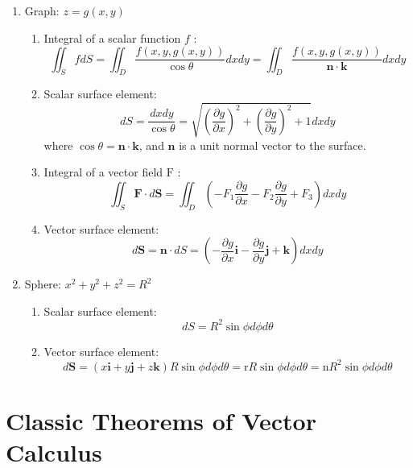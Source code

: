 \documentclass[11pt]{article}
\begin{document}
\begin{enumerate}
    \item Graph: $z=g(x, y)$
    \begin{enumerate}
        \item[a.] Integral of a scalar function $f$ :
        $$
        \iint_{S} f d S=\iint_{D} \frac{f(x, y, g(x, y))}{\cos \theta} d x d y=\iint_{D} \frac{f(x, y, g(x, y))}{\mathbf{n\cdot k}} d x d y
        $$
        \item[b.] Scalar surface element:
        $$
        d S=\frac{d x d y}{\cos \theta}=\sqrt{\left(\frac{\partial g}{\partial x}\right)^{2}+\left(\frac{\partial g}{\partial y}\right)^{2}+1} d x d y
        $$
        where $\cos \theta=\mathbf{n} \cdot \mathbf{k}$, and $\mathbf{n}$ is a unit normal vector to the surface.
        \item[c.] Integral of a vector field $\mathrm{F}$ :
        $$
        \iint_{S} \mathbf{F} \cdot d \mathbf{S}=\iint_{D}\left(-F_{1} \frac{\partial g}{\partial x}-F_{2} \frac{\partial g}{\partial y}+F_{3}\right) d x d y
        $$
        \item[d.] Vector surface element:
        $$
        d \mathbf{S}=\mathbf{n} \cdot d S=\left(-\frac{\partial g}{\partial x} \mathbf{i}-\frac{\partial g}{\partial y} \mathbf{j}+\mathbf{k}\right) d x d y
        $$
    \end{enumerate} 
    \item Sphere: $x^{2}+y^{2}+z^{2}=R^{2}$
    \begin{enumerate}
        \item[a.] Scalar surface element:
        $$
        d S=R^{2} \sin \phi d \phi d \theta
        $$
        \item[b.] Vector surface element:
        $$
        d \mathbf{S}=(x \mathbf{i}+y \mathbf{j}+z \mathbf{k}) R \sin \phi d \phi d \theta=\mathrm{r} R \sin \phi d \phi d \theta=\mathrm{n} R^{2} \sin \phi d \phi d \theta
        $$
    \end{enumerate}
       
\end{enumerate}

\section{Classic Theorems of Vector Calculus}
\end{document}

